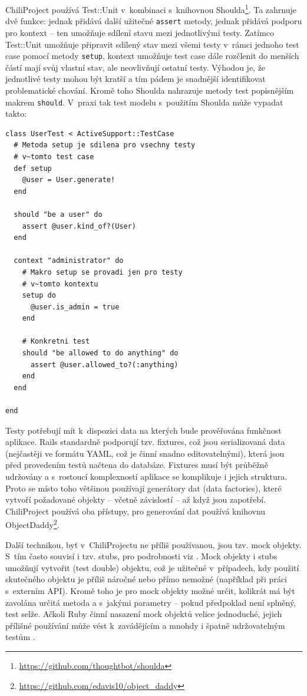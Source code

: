 \documentclass[thesis=B,czech]{FITthesis}[2012/05/02]
\begin{document}
ChiliProject používá Test::Unit v~kombinaci s~knihovnou
Shoulda\footnote{\url{https://github.com/thoughtbot/shoulda}}. Ta
zahrnuje dvě funkce: jednak přidává další užitečné \lstinline!assert!
metody, jednak přidává podporu pro kontext -- ten umožňuje sdílení stavu
mezi jednotlivými testy. Zatímco Test::Unit umožňuje připravit sdílený
stav mezi všemi testy v~rámci jednoho test case pomocí metody
\lstinline!setup!, kontext umožňuje test case dále rozčlenit do menších
částí mají svůj vlastní stav, ale neovlivňují ostatní testy. Výhodou je,
že jednotlivé testy mohou být kratší a tím pádem je snadnější
identifikovat problematické chování. Kromě toho Shoulda nahrazuje metody
test popisnějším makrem \lstinline!should!. V~praxi tak test modelu
s~použitím Shoulda může vypadat takto:

\begin{lstlisting}
class UserTest < ActiveSupport::TestCase
  # Metoda setup je sdilena pro vsechny testy
  # v~tomto test case
  def setup
    @user = User.generate!
  end

  should "be a user" do
    assert @user.kind_of?(User)
  end

  context "administrator" do
    # Makro setup se provadi jen pro testy
    # v~tomto kontextu
    setup do
      @user.is_admin = true
    end

    # Konkretni test
    should "be allowed to do anything" do
      assert @user.allowed_to?(:anything)
    end
  end

end
\end{lstlisting}
Testy potřebují mít k~dispozici data na kterých bude prověřována
funkčnost aplikace. Rails standardně podporují tzv. fixtures, což jsou
serializovaná data (nejčastěji ve formátu YAML, což je činní
snadno editovatelnými), která jsou před provedením testů načtena do
databáze. Fixtures musí být průběžně udržovány a s~rostoucí komplexností
aplikace se komplikuje i jejich struktura. Proto se místo toho většinou
používají generátory dat (data factories), které vytvoří požadované
objekty -- včetně závislostí -- až když jsou zapotřebí. ChiliProject
používá oba přístupy, pro generování dat používá knihovnu
ObjectDaddy\footnote{\url{https://github.com/edavis10/object_daddy}}.

Další technikou, byť v~ChiliProjectu ne příliš používanou, jsou tzv.
mock objekty. S~tím často souvisí i tzv. stubs, pro podrobnosti viz
\citep{FowlerMocks}. Mock objekty i stubs umožňují vytvořit
 (test double) objektu, což je užitečné
v~případech, kdy použití skutečného objektu je příliš náročné nebo přímo
nemožné (například při práci s~externím API). Kromě toho je pro
mock objekty možné určit, kolikrát má být zavolána určitá metoda a
s~jakými parametry -- pokud předpoklad není splněný, test selže. Ačkoli
Ruby činní nasazení mock objektů velice jednoduché, jejich přílišné
používání může vést k~zavádějícím a mnohdy i špatně udržovatelným testům
\citep{Parsons2011}.
\end{document}
